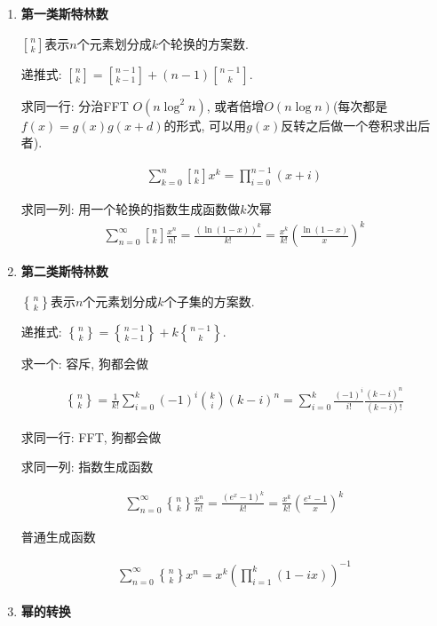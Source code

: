 \begin{enumerate}

\item \textbf{第一类斯特林数}

$n\brack k$表示$n$个元素划分成$k$个轮换的方案数.

递推式: ${n \brack k} = {n-1 \brack k-1} + (n-1){n-1 \brack k}$.

求同一行: 分治FFT $O(n\log ^2 n)$, 或者倍增$O(n\log n)$(每次都是$f(x) = g(x) g(x + d)$的形式, 可以用$g(x)$反转之后做一个卷积求出后者).

$$ \begin{aligned} \sum_{k = 0} ^ n {n \brack k} x^k = \prod_{i = 0} ^ {n - 1} (x + i) \end{aligned} $$

求同一列: 用一个轮换的指数生成函数做$k$次幂
$$\begin{aligned} \sum_{n = 0} ^ \infty {n \brack k} \frac {x ^ n} {n!} = \frac {\left(\ln (1 - x)\right) ^ k} {k!} = \frac {x ^ k} {k!} \left( \frac {\ln (1 - x)} x \right) ^ k \end{aligned}$$

\item \textbf{第二类斯特林数}

$n\brace k$表示$n$个元素划分成$k$个子集的方案数.

递推式: ${n \brace k} = {n-1 \brace k-1} + k{n-1 \brace k}$.

求一个: 容斥, 狗都会做

$$\begin{aligned} {n \brace k} = \frac 1 {k!} \sum_{i = 0} ^ k (-1) ^ i {k \choose i} (k - i) ^ n = \sum_{i = 0} ^ k \frac {(-1) ^ i} {i!} \frac {(k - i) ^ n} {(k - i)!} \end{aligned}$$

求同一行: FFT, 狗都会做

求同一列: 指数生成函数

$$\begin{aligned} \sum_{n = 0} ^ \infty {n \brace k} \frac {x ^ n} {n!} = \frac {\left(e ^ x - 1\right) ^ k} {k!} = \frac {x ^ k} {k!} \left( \frac {e ^ x - 1} x \right) ^ k \end{aligned}$$

普通生成函数

$$\begin{aligned} \sum_{n = 0} ^ \infty {n \brace k} x ^ n = x ^ k \left(\prod_{i = 1} ^ k (1 - i x)\right) ^ {-1} \end{aligned}$$

\item \textbf{幂的转换}


\end{enumerate}
